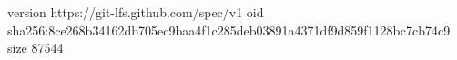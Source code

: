 version https://git-lfs.github.com/spec/v1
oid sha256:8ce268b34162db705ec9baa4f1c285deb03891a4371df9d859f1128bc7cb74c9
size 87544
